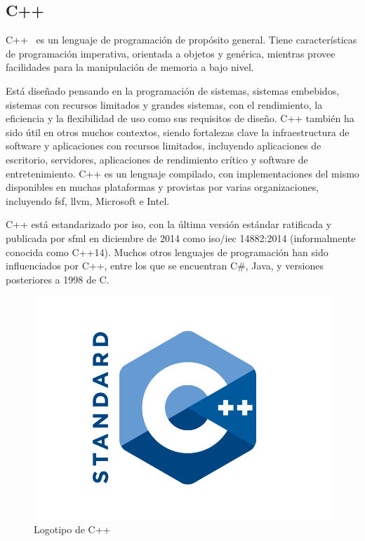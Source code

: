 	\subsection{C++}

		C++~\cite{cpp} es un lenguaje de programación de propósito general. Tiene características de programación imperativa, orientada a objetos y genérica, mientras provee facilidades para la manipulación de memoria a bajo nivel.

		Está diseñado pensando en la programación de sistemas, sistemas embebidos, sistemas con recursos limitados y grandes sistemas, con el rendimiento, la eficiencia y la flexibilidad de uso como sus requisitos de diseño. C++ también ha sido útil en otros muchos contextos, siendo fortalezas clave la infraestructura de software y aplicaciones con recursos limitados, incluyendo aplicaciones de escritorio, servidores, aplicaciones de rendimiento crítico y software de entretenimiento. C++ es un lenguaje compilado, con implementaciones del mismo disponibles en muchas plataformas y provistas por varias organizaciones, incluyendo \acrshort{fsf}, \acrshort{llvm}, Microsoft e Intel.

		C++ está estandarizado por \acrshort{iso}, con la última versión estándar ratificada y publicada por \acrshort{sfml} en diciembre de 2014 como \acrshort{iso}/\acrshort{iec} 14882:2014 (informalmente conocida como C++14). Muchos otros lenguajes de programación han sido influenciados por C++, entre los que se encuentran C\#, Java, y versiones posteriores a 1998 de C.

		\begin{figure}[!htp]
			 \centering
			 \includegraphics[scale=.25]{fig/cpp}
			 \caption{Logotipo de C++}
			 \label{fig:cpp}
		\end{figure}

